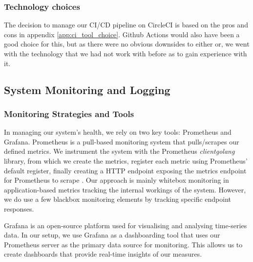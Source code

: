\subsubsection*{Technology choices}
The decision to manage our CI/CD pipeline on CircleCI is based on the pros and cons in appendix \ref{app:ci_tool_choice}. Github Actions would also have been a good choice for this, but as there were no obvious downsides to either or, we went with the technology that we had not work with before as to gain experience with it.





\subsection{System Monitoring and Logging}

\subsubsection*{Monitoring Strategies and Tools}

In managing our system's health, we rely on two key tools: Prometheus and Grafana. Prometheus is a pull-based monitoring system that pulls/scrapes our defined metrics. We instrument the system with the Prometheus \textit{client\textunderscore golang} library, from which we create the metrics, register each metric using Prometheus' default register, finally creating a HTTP endpoint exposing the metrics endpoint for Prometheus to scrape \cite{prometheusGolang}. Our approach is mainly whitebox monitoring in application-based metrics tracking the internal workings of the system. However, we do use a few blackbox monitoring elements by tracking specific endpoint responses.

Grafana is an open-source platform used for visualising and analysing time-series data. In our setup, we use Grafana as a dashboarding tool that uses our Prometheus server as the primary data source for monitoring. This allows us to create dashboards that provide real-time insights of our measures.

